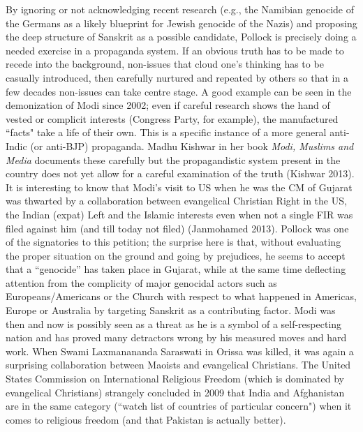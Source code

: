 By ignoring or not acknowledging recent research (e.g., the Namibian genocide of the Germans as a likely blueprint for Jewish genocide of the Nazis) and proposing the deep structure of Sanskrit as a possible candidate, Pollock is precisely doing a needed exercise in a propaganda system. If an obvious truth has to be made to recede into the background, non-issues that cloud one's thinking has to be casually introduced, then carefully nurtured and repeated by others so that in a few decades non-issues can take centre stage. A good example can be seen in the demonization of Modi since 2002; even if careful research shows the hand of vested or complicit interests (Congress Party, for example), the manufactured ``facts" take a life of their own. This is a specific instance of a more general anti-Indic (or anti-BJP) propaganda. Madhu Kishwar in her book {\sl Modi, Muslims and Media} documents these carefully but the propagandistic system present in the country does not yet allow for a careful examination of the truth (Kishwar 2013). It is interesting to know that Modi’s visit to US when he was the CM of Gujarat was thwarted by a collaboration between evangelical Christian Right in the US, the Indian (expat) Left and the Islamic interests even when not a single FIR was filed against him (and till today not filed) (Janmohamed 2013). Pollock was one of the signatories to this petition; the surprise here is that, without evaluating the proper situation on the ground and going by prejudices, he seems to accept that a “genocide” has taken place in Gujarat, while at the same time deflecting attention from the complicity of major genocidal actors such as Europeans/Americans or the Church with respect to what happened in Americas, Europe or Australia by targeting Sanskrit as a contributing factor. Modi was then and now is possibly seen as a threat as he is a symbol of a self-respecting nation and has proved many detractors wrong by his measured moves and hard work. When Swami Laxmanananda Saraswati in Orissa was killed, it was again a surprising collaboration between Maoists and evangelical Christians. The United States Commission on International Religious Freedom (which is dominated by evangelical Christians) strangely concluded in 2009 that India and Afghanistan are in the same category (``watch list of countries of particular concern") when it comes to religious freedom (and that Pakistan is actually better).


